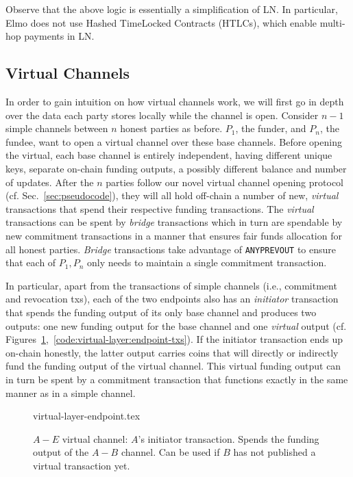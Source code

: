   Observe that the above logic is essentially a simplification of LN. In
  particular, Elmo does not use Hashed TimeLocked Contracts (HTLCs), which
  enable multi-hop payments in LN.

\subsection{Virtual Channels}
  In order to gain intuition on how virtual channels work, we will first
  go in depth over the data each party stores locally while the channel is open.
  Consider $n-1$
  simple channels between $n$ honest parties as before. $P_1$, the
  funder, and $P_n$, the fundee, want to open a virtual channel over these base
  channels.
  Before opening the virtual, each base channel is entirely independent, having
  different unique keys, separate on-chain funding outputs, a possibly different
  balance and number of updates. After the $n$ parties follow our novel virtual
  channel opening protocol (cf. Sec.~\ref{sec:pseudocode}), they will all
  hold off-chain a number of new,
  \emph{virtual} transactions that spend their respective funding transactions. The
  \emph{virtual} transactions can be spent by \emph{bridge} transactions which in turn
  are spendable by new commitment transactions in a manner that ensures fair
  funds allocation for all honest parties. \emph{Bridge} transactions take
  advantage of \texttt{ANYPREVOUT} to ensure that each of $P_1, P_n$ only needs
  to maintain a single commitment transaction.

  In particular, apart from the transactions of simple channels (i.e.,
  commitment and revocation txs), each of the two
  endpoints also has an \emph{initiator} transaction that spends the funding output
  of its only base channel and produces two outputs: one new funding output for
  the base channel and one \emph{virtual} output (cf.
  Figures~\ref{figure:virtual-layer-endpoint},~\ref{code:virtual-layer:endpoint-txs}).
  If the initiator transaction ends up on-chain honestly, the latter output
  carries coins that will directly or indirectly fund the funding output of the
  virtual channel. This virtual funding output can in turn be spent by a
  commitment transaction that functions exactly in the same manner as in a
  simple channel.

  \begin{figure}
    {virtual-layer-endpoint.tex}
    \caption{$A-E$ virtual channel: $A$'s initiator transaction. Spends the
    funding output of the $A-B$ channel. Can be used if $B$ has not published
    a virtual transaction yet.}
    \label{figure:virtual-layer-endpoint}
  \end{figure}

